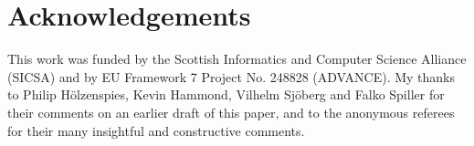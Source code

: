 \documentclass{jfp1}
\newcounter{per}
\begin{document}




%





%

%



\section*{Acknowledgements}

This work was funded by the Scottish Informatics and Computer Science Alliance
(SICSA) and by EU Framework 7 Project No. 248828 (ADVANCE).  My thanks to
Philip H\"{o}lzenspies, Kevin Hammond, Vilhelm Sj\"{o}berg and Falko Spiller
for their comments on an earlier draft of this paper, and to the anonymous
referees for their many insightful and constructive comments.




\appendix





%
\end{document}

